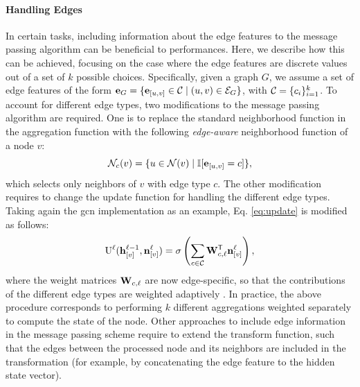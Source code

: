 \paragraph{Handling Edges}
In certain tasks, including information about the edge features to the message passing algorithm can be beneficial to performances. Here, we describe how this can be achieved, focusing on the case where the edge features are discrete values out of a set of $k$ possible choices. Specifically, given a graph $G$, we assume a set of edge features of the form $\Vector{e}_G = \Set{\Elem{e}{u,v} \in \Cal{C} \mid (u, v) \in \Cal{E}_G}$, with $\Cal{C} = \Set{c_i}_{i=1}^k$. To account for different edge types, two modifications to the message passing algorithm are required. One is to replace the standard neighborhood function in the aggregation function with the following \emph{edge-aware} neighborhood function of a node $v$:
$$\Cal{N}_c(v) = \Set{u \in \Cal{N}(v) \mid \mathbb{I}[\Elem{e}{u, v} = c]},$$
which selects only neighbors of $v$ with edge type $c$. The other modification requires to change the update function for handling the different edge types. Taking again the \gls{gcn} implementation as an example, Eq. \ref{eq:update} is modified as follows:
\begin{align*}
    \Fun{U}^{\ell}(\Elem{h}{v}^{\ell-1}, \Elem{n}{v}^{\ell}) = \sigma\Paren{\sum_{c \in \Cal{C}} \Matrix{W}^{\Transpose}_{c,\ell} \Elem{n}{v}^{\ell}},
\end{align*}
where the weight matrices $\Matrix{W}_{c,\ell}$ are now edge-specific, so that the contributions of the different edge types are weighted adaptively \citep{micheli2009nn4g,schlichtkrull2018relationaldatagcn}. In practice, the above procedure corresponds to performing $k$ different aggregations weighted separately to compute the state of the node. Other approaches to include edge information in the message passing scheme require to extend the transform function, such that the edges between the processed node and its neighbors are included in the transformation (for example, by concatenating the edge feature to the hidden state vector).

